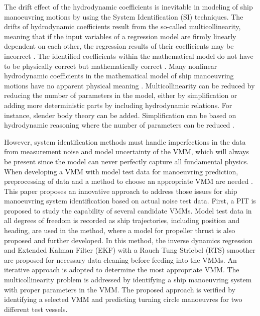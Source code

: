 \documentclass[review]{elsarticle}
\begin{document}
% 
The drift effect of the hydrodynamic coefficients is inevitable in modeling of ship manoeuvring motions by using the System Identification (SI) techniques. The drifts of hydrodynamic coefficients result from the so-called multicollinearity, meaning that if the input variables of a regression model are firmly linearly dependent on each other, the regression results of their coefficients may be incorrect \cite{luo_parameter_2016}. The identified coefficients within the mathematical model do not have to be physically correct but mathematically correct \cite{ittc_maneuvering_2008}. Many nonlinear hydrodynamic coefficients in the mathematical model of ship manoeuvring motions have no apparent physical meaning \cite{luo_parameter_2016}. Multicollinearity can be reduced by reducing the number of parameters in the model, either by simplification or adding more deterministic parts by including hydrodynamic relations. For instance, slender body theory can be added\cite{hwang_cancellation_1982}. Simplification can be based on hydrodynamic reasoning where the number of parameters can be reduced \cite{luo_parameter_2016}.

 
However, system identification methods must handle imperfections in the data from measurement noise and model uncertainty of the VMM, which will always be present since the model can never perfectly capture all fundamental physics. When developing a VMM with model test data for manoeuvring prediction, preprocessing of data and a method to choose an appropriate VMM are needed \cite{alexandersson_comparison_2022}.
This paper proposes an innovative approach to address those issues for ship manoeuvring system identification based on actual noise test data. First, a PIT is proposed to study the capability of several candidate VMMs. Model test data in all degrees of freedom is recorded as ship trajectories, including position and heading, are used in the method, where a model for propeller thrust is also proposed and further developed. In this method, the inverse dynamics regression and Extended Kalman Filter (EKF) with a Rauch Tung Striebel (RTS) smoother \cite{rauch_maximum_1965} are proposed for necessary data cleaning before feeding into the VMMs. An iterative approach is adopted to determine the most appropriate VMM. The multicollinearity problem is addressed by identifying a ship manoeuvring system with proper parameters in the VMM. The proposed approach is verified by identifying a selected VMM and predicting turning circle manoeuvres for two different test vessels.
\end{document}
